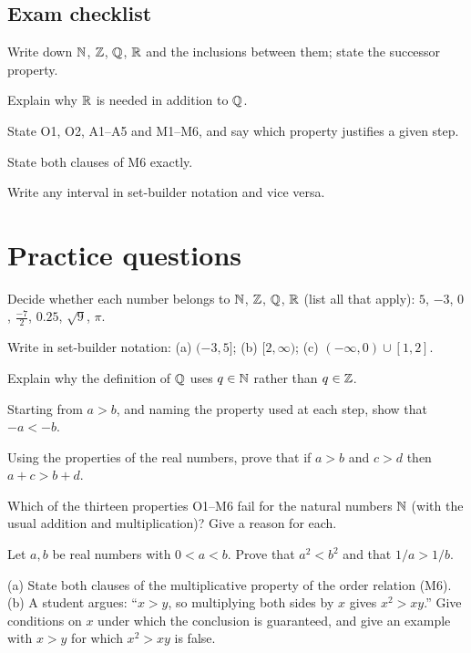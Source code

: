 \subsection*{Exam checklist}
\begin{checklist}
  \item Write down $\mathbb{N}$, $\mathbb{Z}$, $\mathbb{Q}$, $\mathbb{R}$ and the inclusions between them; state the successor property.
  \item Explain why $\mathbb{R}$ is needed in addition to $\mathbb{Q}$.
  \item State O1, O2, A1--A5 and M1--M6, and say which property justifies a given step.
  \item State both clauses of M6 exactly.
  \item Write any interval in set-builder notation and vice versa.
\end{checklist}

\section{Practice questions}
\pq[basic] Decide whether each number belongs to $\mathbb{N}$, $\mathbb{Z}$, $\mathbb{Q}$, $\mathbb{R}$ (list all that apply):
$5$, $-3$, $0$, $\tfrac{-7}{2}$, $0.25$, $\sqrt9$, $\pi$.

\pq[basic] Write in set-builder notation: (a) $(-3,5]$; (b) $[2,\infty)$; (c) $(-\infty,0)\cup[1,2]$.

\pq[conceptual] Explain why the definition of $\mathbb{Q}$ uses $q\in\mathbb{N}$ rather than $q\in\mathbb{Z}$.

\pq[mathematical] Starting from $a>b$, and naming the property used at each step, show that $-a<-b$.

\pq[mathematical] Using the properties of the real numbers, prove that if $a>b$ and $c>d$ then $a+c>b+d$.

\pq[conceptual] Which of the thirteen properties O1--M6 fail for the natural numbers $\mathbb{N}$ (with the usual
addition and multiplication)? Give a reason for each.

 Let $a,b$ be real numbers with $0<a<b$. Prove that $a^2<b^2$ and that $1/a>1/b$.

 (a) State both clauses of the multiplicative property of the order relation (M6).
(b) A student argues: ``$x>y$, so multiplying both sides by $x$ gives $x^2>xy$.'' Give conditions on $x$
under which the conclusion is guaranteed, and give an example with $x>y$ for which $x^2>xy$ is false.

